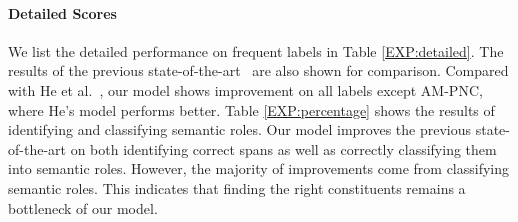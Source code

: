 \documentclass[letterpaper]{article} \usepackage{aaai18}  \usepackage{times}  \usepackage{helvet}  \usepackage{courier}  \usepackage{url}  \usepackage{graphicx}  \frenchspacing  \setlength{\pdfpagewidth}{8.5in}  \setlength{\pdfpageheight}{11in}  \usepackage{latexsym}
\begin{document}
\paragraph{Detailed Scores} We list the detailed performance on frequent labels in Table \ref{EXP:detailed}. The results of the previous state-of-the-art~\cite{he2017deep} are also shown for comparison. Compared with He et al.~, our model shows improvement on all labels except AM-PNC, where He's model performs better. Table \ref{EXP:percentage} shows the results of identifying and classifying semantic roles. Our model improves the previous state-of-the-art on both identifying correct spans as well as correctly classifying them into semantic roles. However, the majority of improvements come from classifying semantic roles. This indicates that finding the right constituents remains a bottleneck of our model.
\end{document}
